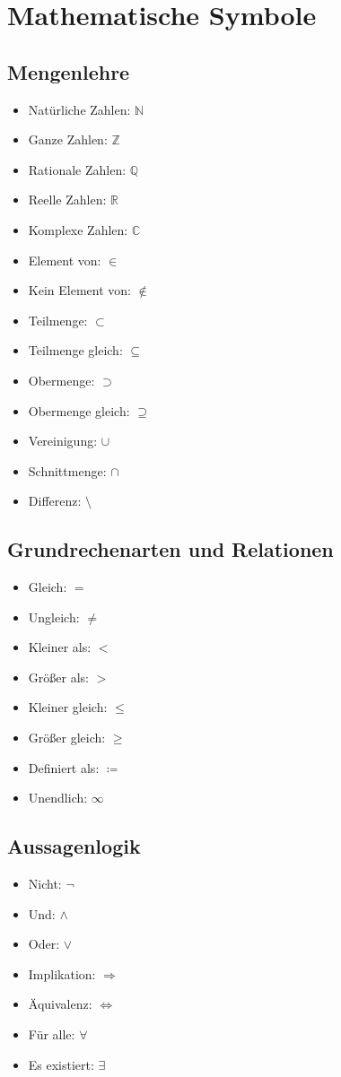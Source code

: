 \documentclass[a4paper,10pt]{article}
\begin{document}
\section{Mathematische Symbole}
\subsection{Mengenlehre}
\begin{itemize}
    \item Natürliche Zahlen: $\mathbb{N}$
    \item Ganze Zahlen: $\mathbb{Z}$
    \item Rationale Zahlen: $\mathbb{Q}$
    \item Reelle Zahlen: $\mathbb{R}$
    \item Komplexe Zahlen: $\mathbb{C}$
    \item Element von: $\in$
    \item Kein Element von: $\notin$
    \item Teilmenge: $\subset$
    \item Teilmenge gleich: $\subseteq$
    \item Obermenge: $\supset$
    \item Obermenge gleich: $\supseteq$
    \item Vereinigung: $\cup$
    \item Schnittmenge: $\cap$
    \item Differenz: $\setminus$
\end{itemize}
\subsection{Grundrechenarten und Relationen}
\begin{itemize}
    \item Gleich: $=$
    \item Ungleich: $\neq$
    \item Kleiner als: $<$
    \item Größer als: $>$
    \item Kleiner gleich: $\leq$
    \item Größer gleich: $\geq$
    \item Definiert als: $\coloneqq$
    \item Unendlich: $\infty$
\end{itemize}
\subsection{Aussagenlogik}
\begin{itemize}
    \item Nicht: $\neg$
    \item Und: $\wedge$
    \item Oder: $\vee$
    \item Implikation: $\Rightarrow$
    \item Äquivalenz: $\Leftrightarrow$
    \item Für alle: $\forall$
    \item Es existiert: $\exists$
\end{itemize}
\end{document}

